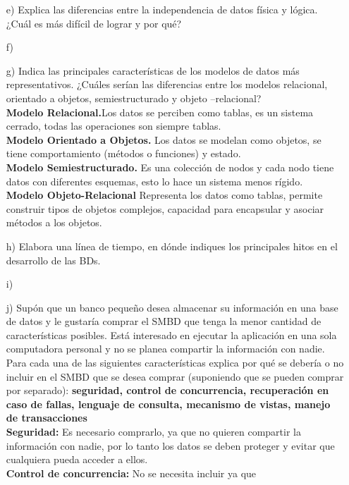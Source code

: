 \documentclass[a4paper, 12pt]{report}
\begin{document}
\begin{enumerate}
{\begin{enumerate}
{\begin{itemize}
     \end{itemize}}
    \item[e)]{Explica las diferencias entre la independencia de datos física y lógica. ¿Cuál es más difícil de lograr y por qué?  }%
    \item[f)]{}
    \item[g)]{Indica las principales características de los modelos de
    datos más representativos. ¿Cuáles serían las diferencias
    entre los  modelos relacional, orientado a objetos,
    semiestructurado y objeto –relacional?\\
    \textbf{Modelo Relacional.}Los datos se perciben como tablas,
    es un sistema cerrado, todas las operaciones son siempre tablas.\\
    \textbf{Modelo Orientado a Objetos.} Los datos se modelan como
    objetos, se tiene comportamiento (métodos o funciones) y estado.\\
    \textbf{Modelo Semiestructurado.} Es una colección de nodos y
    cada nodo tiene datos con diferentes esquemas, esto lo hace un
    sistema menos rígido.\\
    \textbf{Modelo Objeto-Relacional} Representa los datos como tablas,
    permite construir tipos de objetos complejos, capacidad para
    encapsular y asociar métodos a los objetos.}
    \item[h)]{Elabora una línea de tiempo, en dónde indiques los principales hitos en el desarrollo de las BDs.}%
    \item[i)]{}
    \item[j)]{Supón  que  un banco pequeño desea  almacenar  su
    información  en una  base  de  datos  y  le gustaría comprar
    el SMBD que  tenga  la  menor  cantidad  de  características
    posibles. Está interesado en ejecutar la aplicación en una sola computadora personal y no se planea compartir la
    información  con  nadie.  Para  cada  una  de  las
    siguientes  características  explica  por  qué  se debería o
    no incluir en el SMBD que se desea comprar (suponiendo que se
    pueden comprar por separado): \textbf{seguridad, control de
    concurrencia, recuperación en caso de fallas, lenguaje de
    consulta, mecanismo de vistas, manejo de transacciones}\\
    \textbf{Seguridad:} Es necesario comprarlo, ya que no quieren
    compartir la información con nadie, por lo tanto los datos
    se deben proteger y evitar que cualquiera pueda acceder a
    ellos.\\
    \textbf{Control de concurrencia:} No se necesita incluir ya que
}
\end{enumerate}}
\end{enumerate}
\end{document}
